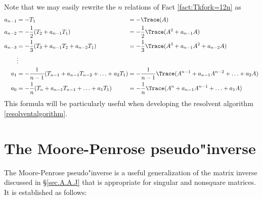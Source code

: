 \noindent Note that we may easily rewrite the $n$ relations of Fact \ref{fact:Tkfork=12n} as
\begin{equation}
\begin{alignedat}{2}
a_{n-1} &= - T_1 &&= -\Trace(A)\\
a_{n-2} &= -\frac{1}{2} (T_2+a_{n-1} T_1) &&= -\frac{1}{2} \Trace(A^2 + a_{n-1} A) \\
a_{n-3} &= -\frac{1}{3} (T_3+a_{n-1} T_2 +a_{n-2} T_1) &&= -\frac{1}{3} \Trace(A^3 + a_{n-1} A^2 + a_{n-2} A) \\
  & \vdots && \\
a_{1} &= -\frac{1}{n-1} (T_{n-1}+a_{n-1} T_{n-2} + \ldots + a_{2} T_1) &&= -\frac{1}{n-1} \Trace(A^{n-1} + a_{n-1} A^{n-2} + \ldots + a_{2} A) \\
a_{0} &= -\frac{1}{n}   (T_{n}+a_{n-1} T_{n-1} + \ldots + a_{1} T_1) &&= -\frac{1}{n}   \Trace(A^{n} + a_{n-1} A^{n-1} + \ldots + a_{1} A) 
\end{alignedat}
\label{eq:Tkfork=12nsum}
\end{equation}
This formula will be particularly useful when developing the resolvent algorithm \eqref{resolventalgorithm}.

\clearpage
\section{The Moore-Penrose pseudo"inverse}\label{sec.A.E}

The Moore-Penrose pseudo"inverse is a useful generalization of the
matrix inverse discussed in \S \ref{sec.A.A.J} that is appropriate for
singular and nonsquare matrices.  It is established as follows:

